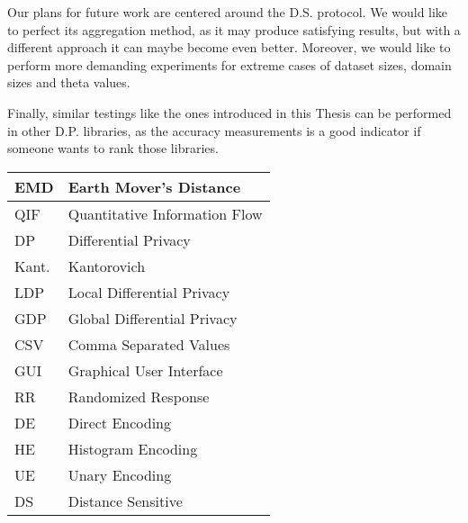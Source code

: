 \documentclass[inscr]{dithesis}
\begin{document}
Our plans for future work are centered around the D.S. protocol. We would like to perfect its aggregation method, as it may produce satisfying results, but with a different approach it can maybe become even better. Moreover, we would like to perform more demanding experiments for extreme cases of dataset sizes, domain sizes and theta values.

Finally, similar testings like the ones introduced in this Thesis can be performed in other D.P. libraries, as the accuracy measurements is a good indicator if someone wants to rank those libraries.


\backmatter

\abbreviations
\begin{center}
	\renewcommand{\arraystretch}{1.5}
	\begin{longtable}{| l | @{\qquad} l |}
	\hline
	EMD & Earth Mover's Distance \\
  \hline
    QIF & Quantitative Information Flow \\
  \hline
	DP & Differential Privacy\\
  \hline
	Kant. & Kantorovich \\
  \hline
  LDP & Local Differential Privacy\\
  \hline
  GDP & Global Differential Privacy\\
  \hline
  CSV & Comma Separated Values\\
  \hline
  GUI & Graphical User Interface\\
  \hline
  RR & Randomized Response\\
  \hline
  DE & Direct Encoding\\
  \hline
  HE & Histogram Encoding\\
  \hline
  UE & Unary Encoding\\
  \hline
  DS & Distance Sensitive\\
  \hline
	\end{longtable}
\end{center}
\end{document}
